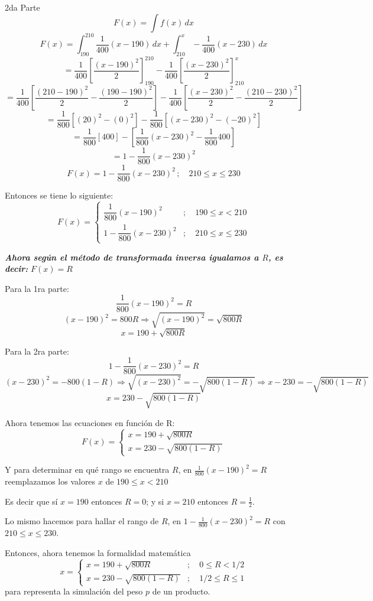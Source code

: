 \documentclass[11pt,letterpaper]{report}
\begin{document}
2da Parte
\[
F(x) = \int f(x)\,dx
\]
\[
F(x) = \int_{190}^{210} \frac{1}{400}(x - 190)\,dx + \int_{210}^x -\frac{1}{400}(x - 230)\,dx
\]
\[
= \frac{1}{400}\left[\frac{(x-190)^2}{2}\right]_{190}^{210} - \frac{1}{400}\left[\frac{(x-230)^2}{2}\right]_{210}^x
\]
\[
= \frac{1}{400}\left[\frac{(210-190)^2}{2} - \frac{(190-190)^2}{2}\right] - \frac{1}{400}\left[\frac{(x-230)^2}{2} - \frac{(210-230)^2}{2}\right]
\]
\[
= \frac{1}{800}\left[(20)^2 - (0)^2\right] - \frac{1}{800}\left[(x-230)^2 - (-20)^2\right]
\]
\[
= \frac{1}{800}[400] - \left[\frac{1}{800}(x-230)^2 - \frac{1}{800}400\right]
\]
\[
= 1 - \frac{1}{800}(x - 230)^2
\]
\[
\boxed{F(x) = 1 - \frac{1}{800}(x - 230)^2\,;\quad 210 \leq x \leq 230}
\]

Entonces se tiene lo siguiente:
\[
F(x) = \begin{cases}
\dfrac{1}{800}(x - 190)^2 & ;\quad 190 \leq x < 210\\[0.3cm]
1 - \dfrac{1}{800}(x - 230)^2 & ;\quad 210 \leq x \leq 230
\end{cases}
\]

\textbf{\textit{Ahora según el método de transformada inversa igualamos a $R$, es decir:}} \quad $F(x) = R$

Para la 1ra parte:
\[
\frac{1}{800}(x - 190)^2 = R
\]
\[
(x - 190)^2 = 800R \Longrightarrow \sqrt{(x - 190)^2} = \sqrt{800R}
\]
\[
\boxed{x = 190 + \sqrt{800R}}
\]

Para la 2ra parte:
\[
1 - \frac{1}{800}(x - 230)^2 = R
\]
\[
(x - 230)^2 = -800(1 - R) \Longrightarrow \sqrt{(x - 230)^2} = -\sqrt{800(1 - R)} \Longrightarrow x - 230 = -\sqrt{800(1 - R)}
\]
\[
\boxed{x = 230 - \sqrt{800(1 - R)}}
\]

Ahora tenemos las ecuaciones en función de R:
\[
F(x) = \begin{cases}
x = 190 + \sqrt{800R}\\
x = 230 - \sqrt{800(1 - R)}
\end{cases}
\]

Y para determinar en qué rango se encuentra $R$, en $\frac{1}{800}(x - 190)^2 = R$ reemplazamos los valores $x$ de $190 \leq x < 210$

Es decir que sí $x = 190$ entonces $R = 0$; y si $x = 210$ entonces $R = \frac{1}{2}$.

Lo mismo hacemos para hallar el rango de $R$, en $1 - \frac{1}{800}(x - 230)^2 = R$ con $210 \leq x \leq 230$.

Entonces, ahora tenemos la formalidad matemática
\[
x = \begin{cases}
x = 190 + \sqrt{800R} & ;\quad 0 \leq R < 1/2\\
x = 230 - \sqrt{800(1 - R)} & ;\quad 1/2 \leq R \leq 1
\end{cases}
\]
para representa la simulación del peso $p$ de un producto.
\end{document}

